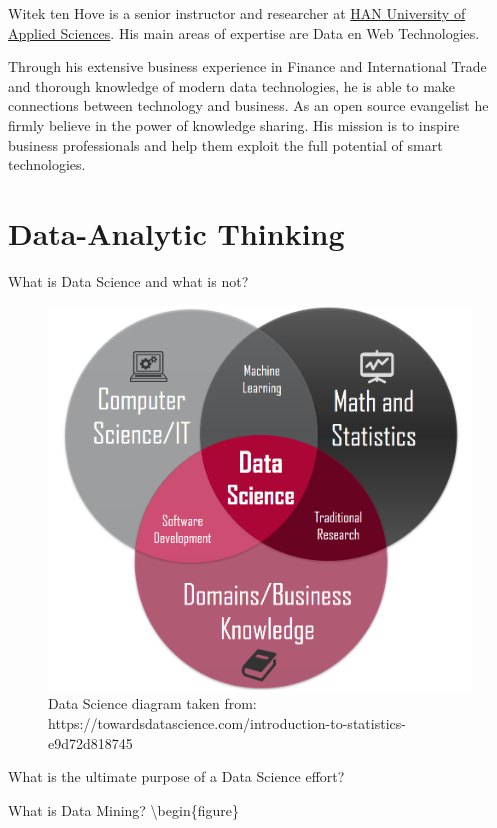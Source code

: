 \documentclass[
]{book}
\begin{document}
Witek ten Hove is a senior instructor and researcher at \href{https://hanuniversity.com/en/}{HAN University of Applied Sciences}. His main areas of expertise are Data en Web Technologies.

Through his extensive business experience in Finance and International Trade and thorough knowledge of modern data technologies, he is able to make connections between technology and business. As an open source evangelist he firmly believe in the power of knowledge sharing. His mission is to inspire business professionals and help them exploit the full potential of smart technologies.

\hypertarget{thinking}{%
\chapter{Data-Analytic Thinking}\label{thinking}}

What is Data Science and what is not?

\begin{figure}

{\centering \includegraphics[width=0.8\linewidth]{images/datascience} 

}

\caption{Data Science diagram taken from: https://towardsdatascience.com/introduction-to-statistics-e9d72d818745}\label{fig:datascience-fig}
\end{figure}

What is the ultimate purpose of a Data Science effort?

What is Data Mining?
\textbackslash begin\{figure\}
\end{document}
